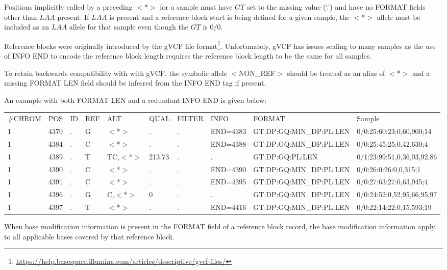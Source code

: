\documentclass[8pt]{article}
\begin{document}
Positions implicitly called by a preceding $<$*$>$ for a sample must have $GT$ set to the missing value (`.') and have no FORMAT fields other than $LAA$ present.
If $LAA$ is present and a reference block start is being defined for a given sample, the $<$*$>$ allele must be included as an $LAA$ allele for that sample even though the $GT$ is $0/0$.

Reference blocks were originally introduced by the gVCF file format\footnote{\url{https://help.basespace.illumina.com/articles/descriptive/gvcf-files/}}.
Unfortunately, gVCF has issues scaling to many samples as the use of INFO END to encode the reference block length requires the reference block length to be the same for all samples.

To retain backwards compatibility with with gVCF,
the symbolic allele $<$NON\_REF$>$ should be treated as an alias of $<$*$>$
and a missing FORMAT LEN field should be inferred from the INFO END tag if present.

An example with both FORMAT LEN and a redundant INFO END is given below:
\scriptsize
\begin{flushleft}
\begin{tabular}{ l l l l l l l l l l }
\#CHROM & POS & ID & REF & ALT & QUAL & FILTER & INFO & FORMAT & Sample \\
1 & 4370 & . & G & $<$*$>$ & . & . & END=4383 & GT:DP:GQ:MIN\_DP:PL:LEN & 0/0:25:60:23:0,60,900;14 \\
1 & 4384 & . & C & $<$*$>$ & . & . & END=4388 & GT:DP:GQ:MIN\_DP:PL:LEN & 0/0:25:45:25:0,42,630;4 \\
1 & 4389 & . & T & TC,$<$*$>$ & 213.73 & . & . & GT:DP:GQ:PL:LEN & 0/1:23:99:51,0,36,93,92,86 \\
1 & 4390 & . & C & $<$*$>$ & . & . & END=4390 & GT:DP:GQ:MIN\_DP:PL:LEN & 0/0:26:0:26:0,0,315;1 \\
1 & 4391 & . & C & $<$*$>$ & . & . & END=4395 & GT:DP:GQ:MIN\_DP:PL:LEN & 0/0:27:63:27:0,63,945;4 \\
1 & 4396 & . & G & C,$<$*$>$ & 0 & . & . & GT:DP:GQ:MIN\_DP:PL:LEN & 0/0:24:52:0,52,95,66,95,97 \\
1 & 4397 & . & T & $<$*$>$ & . & . & END=4416 & GT:DP:GQ:MIN\_DP:PL:LEN & 0/0:22:14:22:0,15,593;19 \\
\end{tabular}
\end{flushleft}
\normalsize

When base modification information is present in the FORMAT field of a reference block record, the base modification information apply to all applicable bases covered by that reference block.
\end{document}
